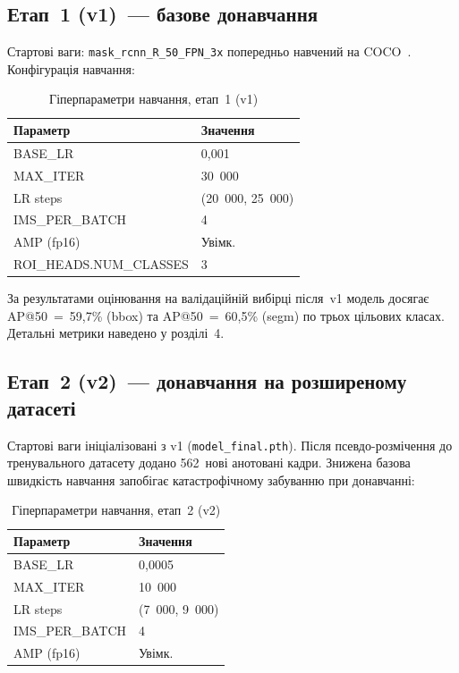 \documentclass[14pt,a4paper]{extreport}
\begin{document}
\subsection*{Етап~1 (v1)~--- базове донавчання}

Стартові ваги: \texttt{mask\_rcnn\_R\_50\_FPN\_3x} попередньо навчений на
COCO~\cite{coco2014}. Конфігурація навчання:

\begin{table}[H]
\caption{Гіперпараметри навчання, етап~1 (v1)}
\label{tab:cfg_v1}
\centering
\begin{tabular}{@{}ll@{}}
\toprule
Параметр & Значення \\
\midrule
BASE\_LR & 0{,}001 \\
MAX\_ITER & 30~000 \\
LR steps  & (20~000, 25~000) \\
IMS\_PER\_BATCH & 4 \\
AMP (fp16) & Увімк. \\
ROI\_HEADS.NUM\_CLASSES & 3 \\
\bottomrule
\end{tabular}
\end{table}

За результатами оцінювання на валідаційній вибірці після~v1 модель
досягає AP@50~=~59{,}7\% (bbox) та AP@50~=~60{,}5\% (segm) по трьох
цільових класах. Детальні метрики наведено у розділі~4.

\subsection*{Етап~2 (v2)~--- донавчання на розширеному датасеті}

Стартові ваги ініціалізовані з v1 (\texttt{model\_final.pth}).
Після псевдо-розмічення до тренувального датасету додано 562~нові
анотовані кадри. Знижена базова швидкість навчання запобігає
катастрофічному забуванню при донавчанні:

\begin{table}[H]
\caption{Гіперпараметри навчання, етап~2 (v2)}
\label{tab:cfg_v2}
\centering
\begin{tabular}{@{}ll@{}}
\toprule
Параметр & Значення \\
\midrule
BASE\_LR & 0{,}0005 \\
MAX\_ITER & 10~000 \\
LR steps  & (7~000, 9~000) \\
IMS\_PER\_BATCH & 4 \\
AMP (fp16) & Увімк. \\
\bottomrule
\end{tabular}
\end{table}
\end{document}
